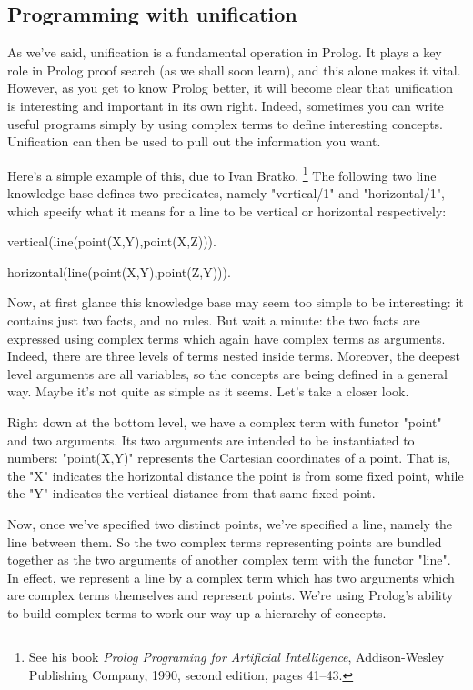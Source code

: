 \subsection*{Programming with unification}\label{SUBSEC.L2.PROGRAMMING-WITH-UNIFICATION}

As we've said, unification is a fundamental operation in Prolog.  It
plays a key role in Prolog proof search (as we shall soon learn), and
this alone makes it vital. However, as you get to know Prolog better,
it will become clear that unification is interesting and important in its
own right. Indeed, sometimes you can write useful programs simply by
using complex terms to define interesting concepts. Unification can then
be used to pull out the information you want.

Here's a simple example of this, due to Ivan Bratko.%
\footnote{See his book
\textit{Prolog Programing for Artificial Intelligence},
Addison-Wesley Publishing Company, 1990, second edition, pages
41--43.}
The following two line knowledge base defines two
predicates, namely "vertical/1" and "horizontal/1", which specify what
it means for a line to be vertical or horizontal respectively:
%
\begin{LPNcodedisplay}
vertical(line(point(X,Y),point(X,Z))).

horizontal(line(point(X,Y),point(Z,Y))).
\end{LPNcodedisplay}


Now, at first glance this knowledge base may seem too simple to be
interesting: it contains just two facts, and no rules.  But wait a
minute: the two facts are expressed using complex terms which again
have complex terms as arguments. Indeed, there are three levels of
terms nested inside terms. Moreover, the deepest level arguments are
all variables, so the concepts are being defined in a general way.
Maybe it's not quite as simple as it seems.  Let's take a closer look.

Right down at the bottom level, we have a complex term with functor
"point" and two arguments. Its two arguments are intended to be
instantiated to numbers: "point(X,Y)" represents the Cartesian
coordinates of a point.  That is, the "X" indicates the horizontal
distance the point is from some fixed point, while the "Y" indicates
the vertical distance from that same fixed point.

Now, once we've specified two distinct points, we've specified a line,
namely the line between them.  So the two complex terms representing
points are bundled together as the two arguments of another complex
term with the functor "line". In effect, we represent a line by a
complex term which has two arguments which are complex terms
themselves and represent points. We're using Prolog's ability to build
complex terms to work our way up a hierarchy of concepts.

